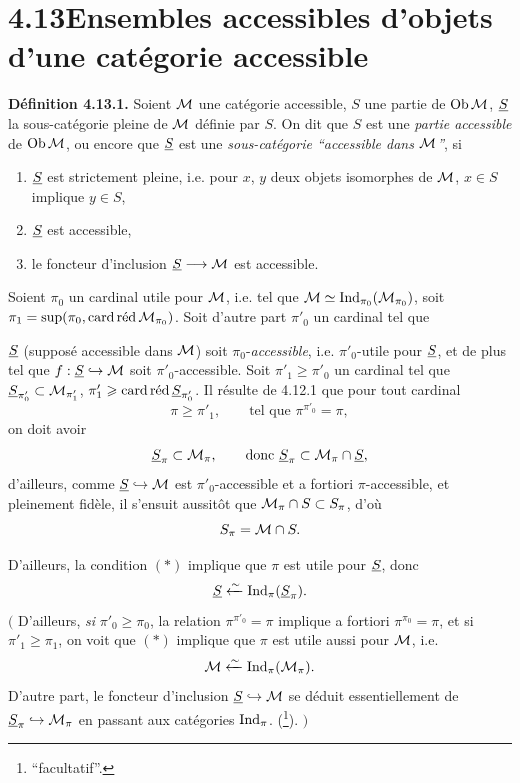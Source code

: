 \section*{4.13\quad Ensembles accessibles d'objets d'une catégorie accessible}

\textbf{Définition 4.13.1.} Soient $\M$ une catégorie accessible, $S$ une partie de $\Ob\M$, $\uS$ la sous-catégorie pleine de $\M$ définie par $S$. On dit que $S$ est une \textit{partie accessible} de $\Ob\M$, ou encore que $\uS$ est une \textit{sous-catégorie “accessible dans $\M$”}, si
\begin{enumerate}
\item[a)] $\uS$ est strictement pleine, i.e. pour $x$, $y$ deux objets isomorphes de $\M$, $x \in S$ implique $y \in S$,
\item[b)] $\uS$ est accessible,
\item[c)] le foncteur d'inclusion $\uS \longrightarrow \M$ est accessible.
\end{enumerate}
Soient $\pi_0$ un cardinal utile pour $\M$, i.e. tel que $\M \simeq \Ind_{\pi_0}(\M_{\pi_0})$, soit $\pi_1 = \sup(\pi_0, \card\red\M_{\pi_0})$. Soit d'autre part $\pi'_0$ un cardinal tel que

$\uS$ (supposé accessible dans $\M$) soit $\pi_0$-\textit{accessible}, i.e. $\pi'_0$-utile pour $\uS$, et de plus tel %
que $f : \uS \hookrightarrow \M$ soit $\pi'_0$-accessible. Soit $\pi'_1 \geqslant \pi'_0$ un cardinal tel que $\uS_{\pi'_0} \subset \M_{\pi'_1}$, $\pi'_1 \geqslant \card\red\uS_{\pi'_0}$. Il résulte de 4.12.1 que pour tout cardinal
\[
\pi \geqslant \pi'_1 , \qquad \text{tel que } \pi^{\pi'_0} = \pi, \tag*{$(*)$}
\]
on doit avoir
\[
\uS_\pi \subset \M_\pi , \qquad \text{donc } \uS_\pi \subset \M_\pi \cap \uS,
\]
d'ailleurs, comme $\uS \hookrightarrow \M$ est $\pi'_0$-accessible et a fortiori $\pi$-accessible, et pleinement fidèle, il s'ensuit aussitôt que $\M_\pi \cap S \subset S_\pi$, d'où
\[
S_\pi = \M \cap S . %
\]

D'ailleurs, la condition $(*)$ implique que $\pi$ est utile pour $\uS$, donc
\[
\uS \xleftarrow{\sim} \Ind_\pi(\uS_\pi) .
\]
$\Big($ D'ailleurs, \textit{si} $\pi'_0 \geqslant \pi_0$, la relation $\pi^{\pi'_0} = \pi$ implique a fortiori $\pi^{\pi_0} = \pi$, et si $\pi'_1 \geqslant \pi_1$, on voit que $(*)$ implique que $\pi$ est utile aussi pour $\M$, i.e.
\[
\M \xleftarrow{\sim} \Ind_\pi(\M_\pi) .
\]
D'autre part, le foncteur d'inclusion $\uS \hookrightarrow \M$ se déduit essentiellement de $\uS_\pi \hookrightarrow \M_\pi$ en passant aux catégories $\Ind_\pi$. (\footnote[116]{ “facultatif”.}). $\Big)$

